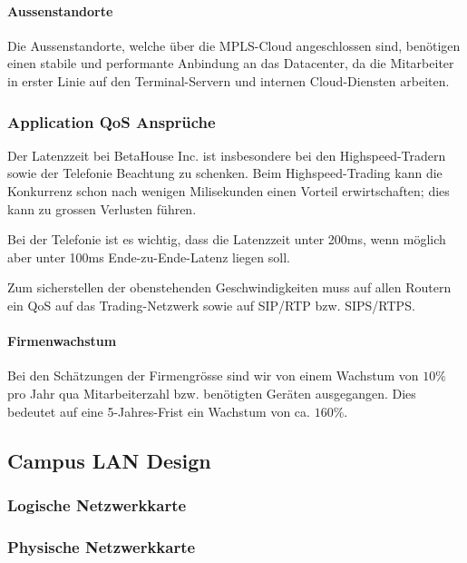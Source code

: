 \paragraph{Aussenstandorte}

Die Aussenstandorte, welche über die MPLS-Cloud angeschlossen sind, benötigen einen stabile und performante Anbindung an das Datacenter, da die Mitarbeiter in erster Linie auf den Terminal-Servern und internen Cloud-Diensten arbeiten.

\subsubsection{Application QoS Ansprüche}

Der Latenzzeit bei BetaHouse Inc. ist insbesondere bei den Highspeed-Tradern sowie der Telefonie Beachtung zu schenken. Beim Highspeed-Trading kann die Konkurrenz schon nach wenigen Milisekunden einen Vorteil erwirtschaften; dies kann zu grossen Verlusten führen.

Bei der Telefonie ist es wichtig, dass die Latenzzeit unter 200ms, wenn möglich aber unter 100ms Ende-zu-Ende-Latenz liegen soll.

Zum sicherstellen der obenstehenden Geschwindigkeiten muss auf allen Routern ein QoS auf das Trading-Netzwerk sowie auf SIP/RTP bzw. SIPS/RTPS.


\paragraph{Firmenwachstum}
Bei den Schätzungen der Firmengrösse sind wir von einem Wachstum von $10\%$ pro Jahr qua Mitarbeiterzahl bzw. benötigten Geräten ausgegangen. Dies bedeutet auf eine 5-Jahres-Frist ein Wachstum von ca. $160\%$.

\subsection{Campus LAN Design}

\subsubsection{Logische Netzwerkkarte}
\subsubsection{Physische Netzwerkkarte}

